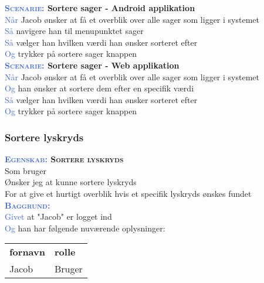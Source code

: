 \textbf{\textsc{\textcolor{RoyalBlue}{Scenarie:}} Sortere sager - Android applikation}\\
\textcolor{RoyalBlue}{Når} Jacob ønsker at få et overblik over alle sager som ligger i systemet\\
\textcolor{RoyalBlue}{Så} navigere han til menupunktet sager\\
\textcolor{RoyalBlue}{Så} vælger han hvilken værdi han ønsker sorteret efter\\
\textcolor{RoyalBlue}{Og} trykker på sortere sager knappen\\

\textbf{\textsc{\textcolor{RoyalBlue}{Scenarie:}} Sortere sager - Web applikation}\\
\textcolor{RoyalBlue}{Når} Jacob ønsker at få et overblik over alle sager som ligger i systemet\\
\textcolor{RoyalBlue}{Og} han ønsker at sortere dem efter en specifik værdi\\
\textcolor{RoyalBlue}{Så} vælger han hvilken værdi han ønsker sorteret efter\\
\textcolor{RoyalBlue}{Og} trykker på sortere sager knappen\\

\clearpage

\subsubsection{Sortere lyskryds}
\textbf{\textsc{\textcolor{RoyalBlue}{Egenskab:} Sortere lyskryds}}\\
Som bruger\\
Ønsker jeg at kunne sortere lyskryds\\
For at give et hurtigt overblik hvis et specifik lyskryds ønskes fundet\\

\textsc{\textcolor{RoyalBlue}{\textbf{Baggrund:}}}\\
\textcolor{RoyalBlue}{Givet} at "Jacob" er logget ind\\
\textcolor{RoyalBlue}{Og} han har følgende nuværende oplysninger:\\
\begin{tabular}{| l | l |}
	\textbf{fornavn} & \textbf{rolle} \\
	Jacob & Bruger\\
\end{tabular}
\newline \newline

